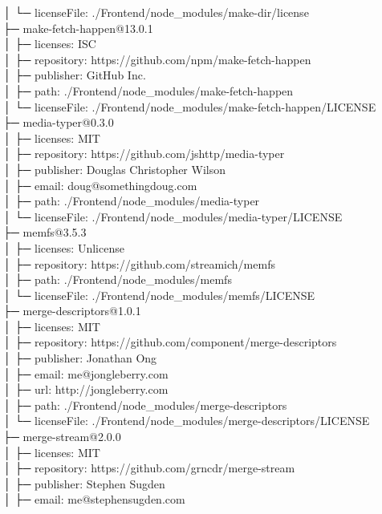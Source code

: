 │  └─ licenseFile: ./Frontend/node\_modules/make-dir/license\\
├─ make-fetch-happen@13.0.1\\
│  ├─ licenses: ISC\\
│  ├─ repository: https://github.com/npm/make-fetch-happen\\
│  ├─ publisher: GitHub Inc.\\
│  ├─ path: ./Frontend/node\_modules/make-fetch-happen\\
│  └─ licenseFile: ./Frontend/node\_modules/make-fetch-happen/LICENSE\\
├─ media-typer@0.3.0\\
│  ├─ licenses: MIT\\
│  ├─ repository: https://github.com/jshttp/media-typer\\
│  ├─ publisher: Douglas Christopher Wilson\\
│  ├─ email: doug@somethingdoug.com\\
│  ├─ path: ./Frontend/node\_modules/media-typer\\
│  └─ licenseFile: ./Frontend/node\_modules/media-typer/LICENSE\\
├─ memfs@3.5.3\\
│  ├─ licenses: Unlicense\\
│  ├─ repository: https://github.com/streamich/memfs\\
│  ├─ path: ./Frontend/node\_modules/memfs\\
│  └─ licenseFile: ./Frontend/node\_modules/memfs/LICENSE\\
├─ merge-descriptors@1.0.1\\
│  ├─ licenses: MIT\\
│  ├─ repository: https://github.com/component/merge-descriptors\\
│  ├─ publisher: Jonathan Ong\\
│  ├─ email: me@jongleberry.com\\
│  ├─ url: http://jongleberry.com\\
│  ├─ path: ./Frontend/node\_modules/merge-descriptors\\
│  └─ licenseFile: ./Frontend/node\_modules/merge-descriptors/LICENSE\\
├─ merge-stream@2.0.0\\
│  ├─ licenses: MIT\\
│  ├─ repository: https://github.com/grncdr/merge-stream\\
│  ├─ publisher: Stephen Sugden\\
│  ├─ email: me@stephensugden.com\\
